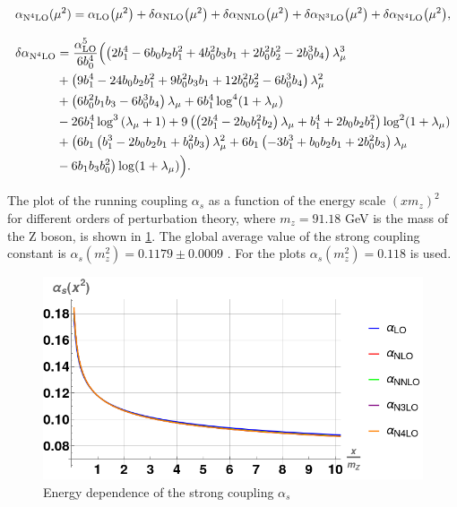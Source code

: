 \documentclass[../Tesi_Jiahao_Miao_986136.tex]{subfiles}
\begin{document}
\begin{equation}\label{eq:N4LO}
    \alpha_{\text{N}^4\text{LO}}(\mu^2) = \alpha_{\text{LO}}\qty(\mu^2) + \delta\alpha_{\text{NLO}}\qty(\mu^2)+\delta\alpha_{\text{NNLO}}\qty(\mu^2)+\delta\alpha_{\text{N}^3\text{LO}}\qty(\mu^2) + \delta\alpha_{\text{N}^4\text{LO}}\qty(\mu^2),
\end{equation}

\begin{equation}\label{eq:DN4LO}
    \begin{split}
        \delta\alpha_{\text{N}^4\text{LO}} &= \frac{\alpha_{\text{LO}}^5}{6 b_0^4} \Bigl( \left(2 b_1^4-6 b_0 b_2 b_1^2+4 b_0^2 b_3 b_1 + 2 b_0^2 b_2^2-2 b_0^3 b_4 \right) \lambda _{\mu}^3 \\
        &+ \left( 9 b_1^4-24 b_0 b_2 b_1^2+9 b_0^2 b_3 b_1+12 b_0^2 b_2^2-6 b_0^3 b_4\right) \lambda_{\mu}^2 \\
        &+ \left(6 b_0^2 b_1 b_3-6 b_0^3 b_4\right) \lambda_{\mu} + 6 b_1^4 \log ^4(1+ \lambda_{\mu})\\
        &- 26 b_1^4 \log ^3\left(\lambda _{\mu }+1\right)+9 \left(\left(2 b_1^4-2 b_0 b_1^2 b_2\right) \lambda _{\mu } + b_1^4+2 b_0 b_2 b_1^2\right) \log ^2(1+\lambda _{\mu})\\
        &+ \bigl(6 b_1 \left(b_1^3-2 b_0 b_2 b_1+b_0^2 b_3\right) \lambda _{\mu }^2
        + 6 b_1 \left(-3 b_1^3+b_0 b_2 b_1+2 b_0^2 b_3\right) \lambda_{\mu}\\
        &- 6 b_1 b_3 b_0^2 \bigr) \log(1+\lambda _{\mu }) \Bigr).
    \end{split}
\end{equation}

The plot of the running coupling $\alpha_s$ as a function of the energy scale $(x m_z)^2$ for different orders of perturbation theory,
where $m_z=91.18$ GeV is the mass of the Z boson, is shown in \cref{fig:alpha_running}. The global average value of the strong coupling constant is $\alpha_s(m_z^2) = 0.1179 \pm 0.0009$ \cite{PDG2022}.
For the plots $\alpha_s(m_z^2) = 0.118$ is used.  

\begin{figure}[htbp]
    \centering
    \includegraphics[width=\textwidth]{figures/alpha_running.png}
    \caption{Energy dependence of the strong coupling $\alpha_s$}
    \label{fig:alpha_running}
\end{figure}
\end{document}
